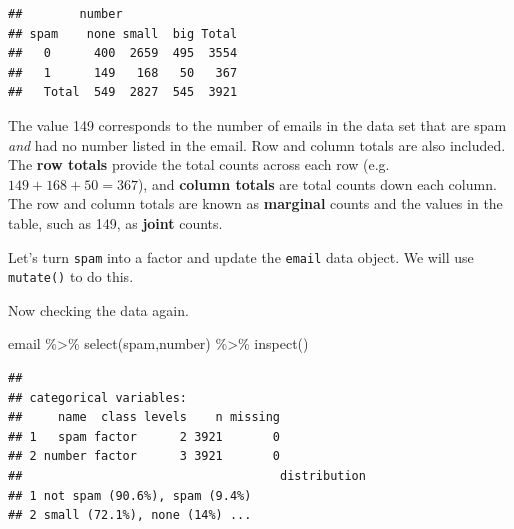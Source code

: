 \documentclass[
]{book}
\newenvironment{Shaded}{\begin{snugshade}}{\end{snugshade}}
\newcommand{\AttributeTok}[1]{\textcolor[rgb]{0.77,0.63,0.00}{#1}}
\newcommand{\DecValTok}[1]{\textcolor[rgb]{0.00,0.00,0.81}{#1}}
\newcommand{\FunctionTok}[1]{\textcolor[rgb]{0.00,0.00,0.00}{#1}}
\newcommand{\NormalTok}[1]{#1}
\newcommand{\OtherTok}[1]{\textcolor[rgb]{0.56,0.35,0.01}{#1}}
\newcommand{\SpecialCharTok}[1]{\textcolor[rgb]{0.00,0.00,0.00}{#1}}
\newcommand{\StringTok}[1]{\textcolor[rgb]{0.31,0.60,0.02}{#1}}
\begin{document}
\begin{verbatim}
##        number
## spam    none small  big Total
##   0      400  2659  495  3554
##   1      149   168   50   367
##   Total  549  2827  545  3921
\end{verbatim}

The value 149 corresponds to the number of emails in the data set that are spam \emph{and} had no number listed in the email. Row and column totals are also included. The \textbf{row totals} provide the total counts across each row (e.g.~\(149 + 168 + 50 = 367\)), and \textbf{column totals} are total counts down each column. The row and column totals are known as \textbf{marginal} counts and the values in the table, such as 149, as \textbf{joint} counts.

Let's turn \texttt{spam} into a factor and update the \texttt{email} data object. We will use \texttt{mutate()} to do this.

\begin{Shaded}
\end{Shaded}

Now checking the data again.

\begin{Shaded}
\begin{Highlighting}[]
\NormalTok{email }\SpecialCharTok{\%\textgreater{}\%}
  \FunctionTok{select}\NormalTok{(spam,number) }\SpecialCharTok{\%\textgreater{}\%}
  \FunctionTok{inspect}\NormalTok{()}
\end{Highlighting}
\end{Shaded}

\begin{verbatim}
## 
## categorical variables:  
##     name  class levels    n missing
## 1   spam factor      2 3921       0
## 2 number factor      3 3921       0
##                                    distribution
## 1 not spam (90.6%), spam (9.4%)                
## 2 small (72.1%), none (14%) ...
\end{verbatim}
\end{document}
